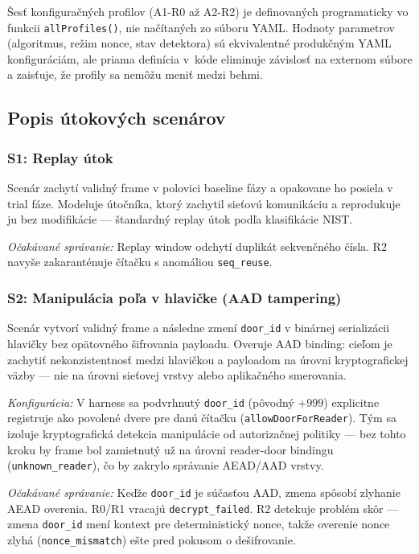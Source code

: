 \noindent Šesť konfiguračných profilov (A1-R0 až A2-R2) je definovaných programaticky vo funkcii \texttt{allProfiles()}, nie načítaných zo súboru YAML. Hodnoty parametrov (algoritmus, režim nonce, stav detektora) sú ekvivalentné produkčným YAML konfiguráciám, ale priama definícia v~kóde eliminuje závislosť na externom súbore a zaisťuje, že profily sa nemôžu meniť medzi behmi.

\subsection{Popis útokových scenárov}
\label{sec:scenarios}

\subsubsection{S1: Replay útok}

Scenár zachytí validný frame v polovici baseline fázy a opakovane ho posiela v trial fáze. Modeluje útočníka, ktorý zachytil sieťovú komunikáciu a reprodukuje ju bez modifikácie --- štandardný replay útok podľa klasifikácie NIST\cite{NIST80098}.

\textit{Očakávané správanie:} Replay window odchytí duplikát sekvenčného čísla. R2 navyše zakaranténuje čítačku s anomáliou \texttt{seq\_reuse}.

\subsubsection{S2: Manipulácia poľa v hlavičke (AAD tampering)}

Scenár vytvorí validný frame a následne zmení \texttt{door\_id} v binárnej serializácii hlavičky bez opätovného šifrovania payloadu. Overuje AAD binding: cieľom je zachytiť nekonzistentnosť medzi hlavičkou a payloadom na úrovni kryptografickej väzby --- nie na úrovni sieťovej vrstvy alebo aplikačného smerovania.

\textit{Konfigurácia:} V harness sa podvrhnutý \texttt{door\_id} (pôvodný $+ 999$) explicitne registruje ako povolené dvere pre danú čítačku (\texttt{allowDoorForReader}). Tým sa izoluje kryptografická detekcia manipulácie od autorizačnej politiky --- bez tohto kroku by frame bol zamietnutý už na úrovni reader-door bindingu (\texttt{unknown\_reader}), čo by zakrylo správanie AEAD/AAD vrstvy.

\textit{Očakávané správanie:} Keďže \texttt{door\_id} je súčasťou AAD, zmena spôsobí zlyhanie AEAD overenia. R0/R1 vracajú \texttt{decrypt\_failed}. R2 detekuje problém skôr --- zmena \texttt{door\_id} mení kontext pre deterministický nonce, takže overenie nonce zlyhá (\texttt{nonce\_mismatch}) ešte pred pokusom o dešifrovanie.

